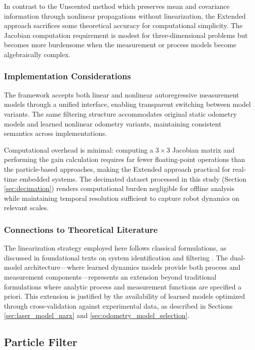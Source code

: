 \documentclass[conference]{IEEEtran}
\begin{document}
In contrast to the Unscented method which preserves mean and covariance information through nonlinear propagations without linearization, the Extended approach sacrifices some theoretical accuracy for computational simplicity. The Jacobian computation requirement is modest for three-dimensional problems but becomes more burdensome when the measurement or process models become algebraically complex.

\subsubsection{Implementation Considerations}

The framework accepts both linear and nonlinear autoregressive measurement models through a unified interface, enabling transparent switching between model variants. The same filtering structure accommodates original static odometry models and learned nonlinear odometry variants, maintaining consistent semantics across implementations.

Computational overhead is minimal: computing a $3 \times 3$ Jacobian matrix and performing the gain calculation requires far fewer floating-point operations than the particle-based approaches, making the Extended approach practical for real-time embedded systems. The decimated dataset processed in this study (Section \ref{sec:decimation}) renders computational burden negligible for offline analysis while maintaining temporal resolution sufficient to capture robot dynamics on relevant scales.

\subsubsection{Connections to Theoretical Literature}

The linearization strategy employed here follows classical formulations, as discussed in foundational texts on system identification and filtering \cite{Aguirre2007}. The dual-model architecture—where learned dynamics models provide both process and measurement components—represents an extension beyond traditional formulations where analytic process and measurement functions are specified a priori. This extension is justified by the availability of learned models optimized through cross-validation against experimental data, as described in Sections \ref{sec:laser_model_narx} and \ref{sec:odometry_model_selection}.

\subsection{Particle Filter} \label{sec:particle_filter}
\end{document}
